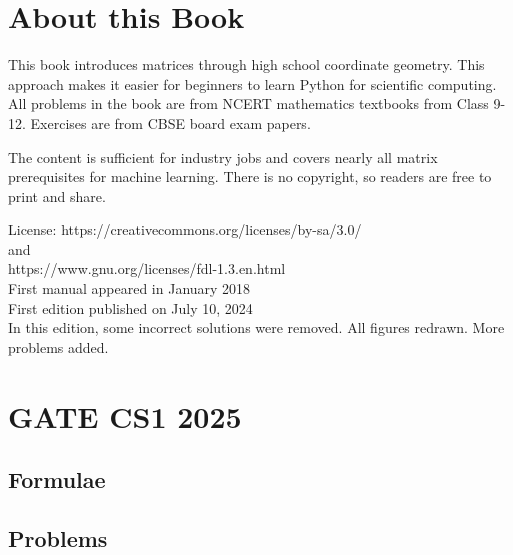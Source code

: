 \documentclass[journal]{IEEEtran}
\begin{document}

\onecolumn

\section*{About this Book}

This book introduces matrices through high school coordinate geometry. This approach makes it easier for beginners to learn Python for scientific computing. All problems in the book are from NCERT mathematics textbooks from Class 9-12. Exercises are from CBSE board exam papers.   

The content is sufficient for industry jobs and covers nearly all matrix prerequisites for machine learning.
There is no copyright, so readers are free to print and share.  

License: https://creativecommons.org/licenses/by-sa/3.0/
\\
and
\\
https://www.gnu.org/licenses/fdl-1.3.en.html
\\
First manual appeared in January 2018
\\
First edition published on July 10, 2024
\\
In this edition, some incorrect solutions were removed. All figures redrawn. More problems added.

\newpage

\tableofcontents

\newpage
\onecolumn

\renewcommand{\thetable}{\theenumi}

\section{GATE CS1 2025}

\subsection{Formulae}


\subsection{Problems}

\end{document}
